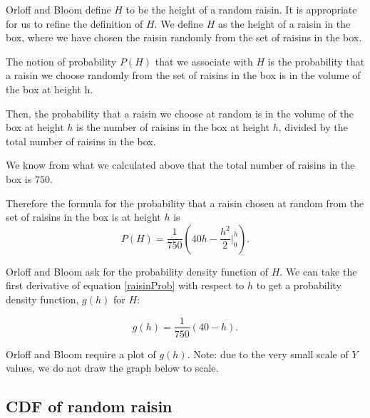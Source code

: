 \documentclass[a4paper,11pt]{article}
\begin{document}
Orloff and Bloom define $H$ to be the height of a random raisin.  It is
appropriate for us to refine the definition of $H$.  We define $H$ as the
height of a raisin in the box, where we have chosen the raisin randomly from
the set of raisins in the box.

The notion of probability $P \left( H \right)$ that we associate with $H$ is the
probability that a raisin we choose randomly from the set of raisins in the box
is in the volume of the box at height h.

Then, the probability that a raisin we choose at random  is in the volume of the
box at height $h$ is the number of raisins in the box at height $h$, divided by
the total number of raisins in the box.

We know from what we calculated above that the total number of raisins in
the box is $750$.

Therefore the formula for the probability that a raisin chosen at random from
the set of raisins in the box is at height $h$ is
\begin{equation} \label{raisinProb}
	P\left( H \right)
 = \frac{1}{750} \left( 40h - \frac{h^{2}}{2} \bigg\rvert_{0}^{h} \right).
\end{equation}

Orloff and Bloom ask for the probability density function of $H$.  We can
take the first derivative of equation \ref{raisinProb} with respect to $h$ to
get a probability density function, $g \left( h \right)$ for $H$:

\begin{equation}
	g\left( h \right) =
	\frac{1}{750} \left( 40 - h \right).
\end{equation}

Orloff and Bloom require a plot of $g \left( h \right)$. Note: due to the very
small scale of $Y$ values, we do not draw the graph below to scale.

\begin{center}
\end{center}

\subsection{CDF of random raisin}
\end{document}
